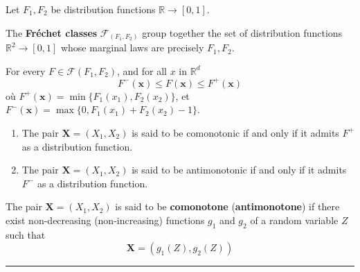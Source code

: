 \begin{f}
Let \(F_1,F_2\) be distribution functions \(\mathbb{R}\rightarrow [0,1]\).

The \textbf{Fréchet classes} \(\mathcal{F}_{(F_1,F_2)}\) group together the set of distribution functions \(\mathbb{R}^2\rightarrow [0,1]\)
whose marginal laws are precisely \(F_1,F_2\).
	
For every \(F \in \mathcal{F} (F_1,F_2)\), and for all \(x\) in \(\mathbb{R}^d\)
\[
F^-(\boldsymbol{x})\leq F (\boldsymbol{x})\leq F^+(\boldsymbol{x})
\]
où \(F^+(\boldsymbol{x}) = \min \{F_1(x_1),F_2(x_2)\}\), et 
\(F^-(\boldsymbol{x}) = \max\{0,F_1(x_1) +F_2(x_2)-1\}\).



\begin{enumerate}
	\item The pair \(\boldsymbol{X}=(X_1,X_2)\) is said to be comonotonic if and only if it admits \(F^+\) as a distribution function.
	\item The pair \(\boldsymbol{X}=(X_1,X_2)\) is said to be antimonotonic if and only if it admits \(F^-\) as a distribution function.
\end{enumerate}

The pair \(\boldsymbol{X}=(X_1,X_2)\) is said to be \textbf{comonotone} (\textbf{antimonotone}) if there exist non-decreasing (non-increasing) functions \(g_1\) and \(g_2\) of a random variable \(Z\) such that
\[
\boldsymbol{X}=(g_1(Z),g_2(Z))
\]
\end{f}
\hrule

